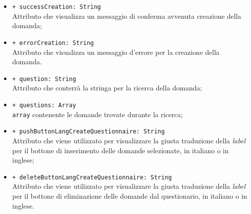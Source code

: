 \begin{itemize}
\begin{itemize}
			\item \texttt{+ successCreation: String} \\ Attributo che visualizza un messaggio di conferma avvenuta creazione della domanda;
			\item \texttt{+ errorCreation: String} \\ Attributo che visualizza un messaggio d'errore per la creazione della domanda.
			\item \texttt{+ question: String} \\ Attributo che conterrà la stringa per la ricerca della domanda;
			\item \texttt{+ questions: Array} \\ \texttt{array} contenente le domande trovate durante la ricerca;
			\item \texttt{+ pushButtonLangCreateQuestionnaire: String} \\ Attributo che viene utilizzato per visualizzare la giusta traduzione della \textit{label} per il bottone di inserimento delle domande selezionate, in italiano o in inglese;
			\item \texttt{+ deleteButtonLangCreateQuestionnaire: String} \\ Attributo che viene utilizzato per visualizzare la giusta traduzione della \textit{label} per il bottone di eliminazione delle domande dal questionario, in italiano o in inglese.
		\end{itemize}
\end{itemize}